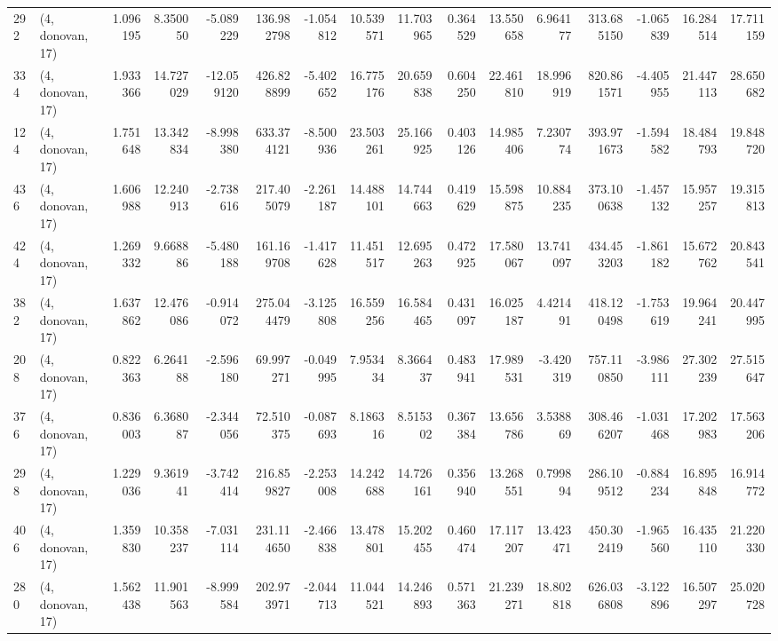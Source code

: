 \begin{tabular}{llrrrrrrrrrrrrrr}
292 &  (4, donovan, 17) &   1.096195 &   8.350050 &  -5.089229 &   136.982798 &  -1.054812 &  10.539571 &  11.703965 &  0.364529 &  13.550658 &   6.964177 &    313.685150 &   -1.065839 &   16.284514 &   17.711159 \\
334 &  (4, donovan, 17) &   1.933366 &  14.727029 & -12.059120 &   426.828899 &  -5.402652 &  16.775176 &  20.659838 &  0.604250 &  22.461810 &  18.996919 &    820.861571 &   -4.405955 &   21.447113 &   28.650682 \\
124 &  (4, donovan, 17) &   1.751648 &  13.342834 &  -8.998380 &   633.374121 &  -8.500936 &  23.503261 &  25.166925 &  0.403126 &  14.985406 &   7.230774 &    393.971673 &   -1.594582 &   18.484793 &   19.848720 \\
436 &  (4, donovan, 17) &   1.606988 &  12.240913 &  -2.738616 &   217.405079 &  -2.261187 &  14.488101 &  14.744663 &  0.419629 &  15.598875 &  10.884235 &    373.100638 &   -1.457132 &   15.957257 &   19.315813 \\
424 &  (4, donovan, 17) &   1.269332 &   9.668886 &  -5.480188 &   161.169708 &  -1.417628 &  11.451517 &  12.695263 &  0.472925 &  17.580067 &  13.741097 &    434.453203 &   -1.861182 &   15.672762 &   20.843541 \\
382 &  (4, donovan, 17) &   1.637862 &  12.476086 &  -0.914072 &   275.044479 &  -3.125808 &  16.559256 &  16.584465 &  0.431097 &  16.025187 &   4.421491 &    418.120498 &   -1.753619 &   19.964241 &   20.447995 \\
208 &  (4, donovan, 17) &   0.822363 &   6.264188 &  -2.596180 &    69.997271 &  -0.049995 &   7.953434 &   8.366437 &  0.483941 &  17.989531 &  -3.420319 &    757.110850 &   -3.986111 &   27.302239 &   27.515647 \\
376 &  (4, donovan, 17) &   0.836003 &   6.368087 &  -2.344056 &    72.510375 &  -0.087693 &   8.186316 &   8.515302 &  0.367384 &  13.656786 &   3.538869 &    308.466207 &   -1.031468 &   17.202983 &   17.563206 \\
298 &  (4, donovan, 17) &   1.229036 &   9.361941 &  -3.742414 &   216.859827 &  -2.253008 &  14.242688 &  14.726161 &  0.356940 &  13.268551 &   0.799894 &    286.109512 &   -0.884234 &   16.895848 &   16.914772 \\
406 &  (4, donovan, 17) &   1.359830 &  10.358237 &  -7.031114 &   231.114650 &  -2.466838 &  13.478801 &  15.202455 &  0.460474 &  17.117207 &  13.423471 &    450.302419 &   -1.965560 &   16.435110 &   21.220330 \\
280 &  (4, donovan, 17) &   1.562438 &  11.901563 &  -8.999584 &   202.973971 &  -2.044713 &  11.044521 &  14.246893 &  0.571363 &  21.239271 &  18.802818 &    626.036808 &   -3.122896 &   16.507297 &   25.020728 \\

\end{tabular}
